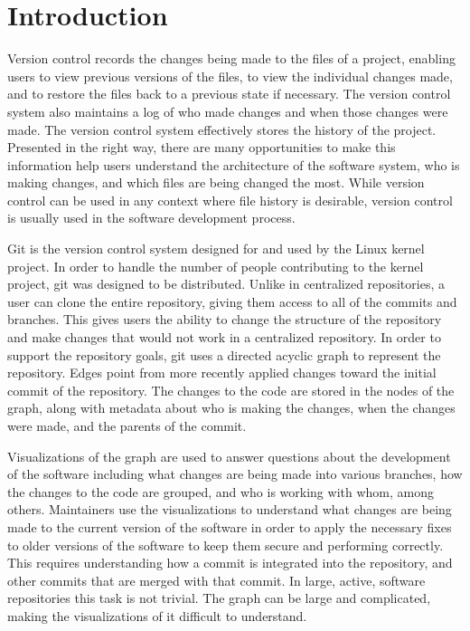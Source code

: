 \chapter{Introduction}

Version control records the changes being made to the files of a
project, enabling users to view previous versions of the files, to view
the individual changes made, and to restore the files back to a previous
state if necessary. The version control system also maintains a log of
who made changes and when those changes were made. The version control
system effectively stores the history of the project. Presented in the
right way, there are many opportunities to make this information help
users understand the architecture of the software system, who is making
changes, and which files are being changed the most. While version
control can be used in any context where file history is desirable,
version control is usually used in the software development process.

Git is the version control system designed for and used by the Linux
kernel project. In order to handle the number of people contributing to
the kernel project, git was designed to be distributed. Unlike in
centralized repositories, a user can clone the entire repository, giving
them access to all of the commits and branches. This gives users the
ability to change the structure of the repository and make changes that
would not work in a centralized repository. In order to support the
repository goals, git uses a directed acyclic graph to represent the
repository. Edges point from more recently applied changes toward the
initial commit of the repository. The changes to the code are stored in
the nodes of the graph, along with metadata about who is making the
changes, when the changes were made, and the parents of the commit.

Visualizations of the graph are used to answer questions about the
development of the software including what changes are being made into
various branches, how the changes to the code are grouped, and who is
working with whom, among others. Maintainers use the visualizations to
understand what changes are being made to the current version of the
software in order to apply the necessary fixes to older versions of the
software to keep them secure and performing correctly. This requires
understanding how a commit is integrated into the repository, and other
commits that are merged with that commit. In large, active, software
repositories this task is not trivial. The graph can be large and
complicated, making the visualizations of it difficult to understand.

